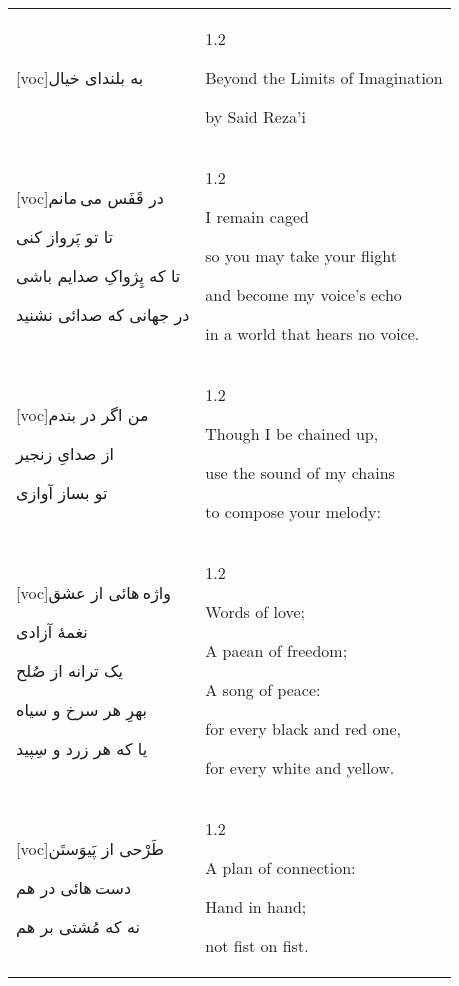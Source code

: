 \documentclass[11pt]{article}
\makeatletter
\newenvironment{orig}
  {\begin{farsi}[voc]}
  {\end{farsi}}
\newenvironment{trans}
  {\Large\begin{spacing}{1.2}\raggedright}
  {\end{spacing}}
\newenvironment{word}
  {\begin{longtable}[t]{p{2.75in}@{\hspace{3em}}p{2.875in}}}
  {\end{longtable}}
\newcommand{\ayat}[2]{\begin{orig}#1\end{orig} & \begin{trans}#2\end{trans}}
\makeatother
\begin{document}
\fontsize{24}{32}

\begin{word}
\ayat{به بلندای خیال}{Beyond the Limits of Imagination

by Said Reza'i} \vspace{-1ex}\\

\ayat{در قَفَس می مانم

تا تو پَرواز کنی

تا که پِژواکِ صدایم باشی

در جهانی که صدائی نشنید}{
\vspace{1em}
I remain caged

so you may take your flight

and become my voice’s echo

in a world that hears no voice.} \vspace{-1ex}\\

\ayat{من اگر در بندم

از صدایِ زنجیر

تو بساز آوازی}{
\vspace{1em}
Though I be chained up,

use the sound of my chains

to compose your melody:
} \vspace{-1ex}\\

\ayat{واژه هائی از عشق

نغمۀ آزادی

یک ترانه از صُلح

بهرِ هر سرخ و سیاه

یا که هر زرد و سِپید}{
\vspace{1em}
Words of love;

A paean of freedom;

A song of peace:

for every black and red one,

for every white and yellow.
} \vspace{-1ex}\\

\ayat{طَرْحی از پَیوَستَن

دست هائی در هم

نه که مُشتی بر هم}{
\vspace{1em}
A plan of connection:

Hand in hand;

not fist on fist.
} \vspace{-1ex}\\


\end{word}
\end{document}
